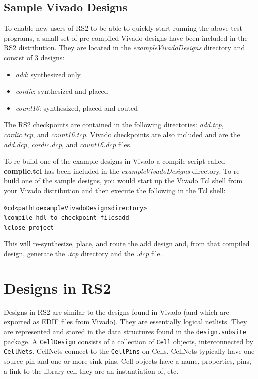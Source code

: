 \documentclass[12pt]{article}
\newcommand{\fil}[1]{{\em #1}}
\newcommand{\cls}[1]{{\texttt{#1}}}
\newcommand{\pkg}[1]{{\texttt{#1}}}
\newcommand{\pgm}[1]{{\textbf{#1}}}
\newcommand{\dir}[1]{{\em #1}}
\newcommand{\sbr}[1]{{\em #1}}
\newenvironment{code}{\begin{center} \begin{minipage}{6in} \noindent \begin{alltt}}{\end{alltt} \end{minipage} \end{center}}
\begin{document}
\subsection{Sample Vivado Designs}
To enable new users of RS2 to be able to quickly start running the above test
programs, a small set of pre-compiled Vivado designs have been included in the
RS2 distribution.  They are located in the \dir{exampleVivadoDesigns} directory
and consist of 3 designs: 
\begin{itemize}
\item \sbr{add}: synthesized only
\item \sbr{cordic}: synthesized and placed
\item \sbr{count16}: synthesized, placed and routed
\end{itemize} 
The RS2 checkpoints are contained in
the following directories: \dir{add.tcp}, \dir{cordic.tcp}, and
\dir{count16.tcp}.
Vivado checkpoints are also included and are the \fil{add.dcp},
\fil{cordic.dcp}, and \fil{count16.dcp} files.  

To re-build one of the example designs in Vivado a compile script called
\pgm{compile.tcl} has been included in the \dir{exampleVivadoDesigns}
directory.  To re-build one of the sample designs, you would start up the Vivado
Tcl shell from your Vivado distribution and then execute the following in the Tcl shell:                
\vspace{-0.15in}  \begin{code}
	\% cd <path to exampleVivadoDesigns directory>
	\% compile_hdl_to_checkpoint_files add
	\% close_project
\end{code}
This will re-synthesize, place, and route the add design and, from that compiled
design, generate the \dir{.tcp} directory and the \fil{.dcp} file.

\section{Designs in RS2}

Designs in RS2 are similar to the designs found in Vivado (and which are
exported as EDIF files from Vivado). 
They are essentially logical netlists.  They are represented and stored in the
data structures found in the \pkg{design.subsite} package.  A \cls{CellDesign}
consists of a collection of \cls{Cell} objects, interconnected by
\cls{CellNets}.
CellNets connect to the \cls{CellPins} on Cells.  CellNets typically have one
source pin and one or more sink pins.  Cell objects have a name, properties, pins, a link to the library cell
they are an instantiation of, etc.
\end{document}
